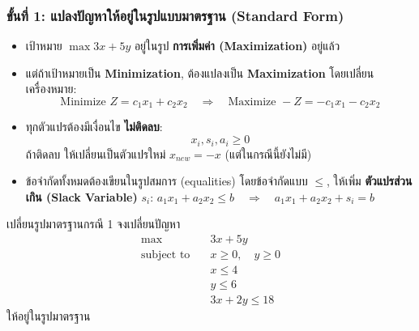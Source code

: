 \subsubsection*{ขั้นที่ 1: แปลงปัญหาให้อยู่ในรูปแบบมาตรฐาน (Standard Form)}
\begin{itemize}
  \item เป้าหมาย $\max 3x + 5y$ อยู่ในรูป \textbf{การเพิ่มค่า (Maximization)} อยู่แล้ว
  \item แต่ถ้าเป้าหมายเป็น \textbf{Minimization}, ต้องแปลงเป็น \textbf{Maximization} โดยเปลี่ยนเครื่องหมาย:
  \[
  \text{Minimize } Z = c_1x_1 + c_2x_2 \quad \Rightarrow \quad \text{Maximize } -Z = -c_1x_1 - c_2x_2
  \]
    \item ทุกตัวแปรต้องมีเงื่อนไข \textbf{ไม่ติดลบ}:
  \[
  x_i, s_i, a_i \geq 0
  \]
    ถ้าติดลบ ให้เปลี่ยนเป็นตัวแปรใหม่ $x_{new} = -x$ (แต่ในกรณีนี้ยังไม่มี)
  \item ข้อจำกัดทั้งหมดต้องเขียนในรูปสมการ (equalities) โดยข้อจำกัดแบบ $\leq$, ให้เพิ่ม \textbf{ตัวแปรส่วนเกิน (Slack Variable)} $s_i$: $a_1x_1 + a_2x_2 \leq b \quad \Rightarrow \quad a_1x_1 + a_2x_2 + s_i = b$

\end{itemize}
\begin{example}{เปลี่ยนรูปมาตรฐานกรณี 1}{}
    จงเปลี่ยนปัญหา
    \begin{align*}
        \max \quad & 3x + 5y \\
        \text{subject to} \quad
        & x \geq 0, \quad y \geq 0 \\
        & x \leq 4 \\
        & y \leq 6 \\
        & 3x + 2y \leq 18
    \end{align*}
    ให้อยู่ในรูปมาตรฐาน
\end{example}

\begin{center}
\end{center}


